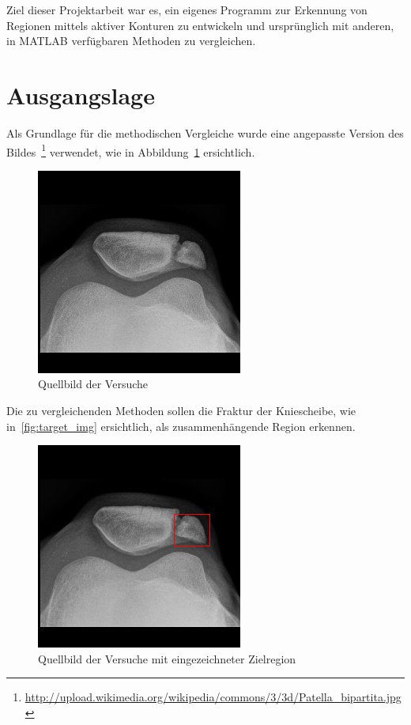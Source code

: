 Ziel dieser Projektarbeit war es, ein eigenes Programm zur Erkennung von Regionen mittels aktiver Konturen zu entwickeln und ursprünglich mit anderen, in MATLAB verfügbaren Methoden zu vergleichen.

\section{Ausgangslage}
\label{sec:proceeding:basics}
Als Grundlage für die methodischen Vergleiche wurde eine angepasste Version des Bildes~\footnote{\url{http://upload.wikimedia.org/wikipedia/commons/3/3d/Patella_bipartita.jpg}} verwendet, wie in Abbildung~\ref{fig:source_img} ersichtlich.

\begin{figure}[h!]
    \centering
    \includegraphics[scale=0.5]{images/patella_bipartita.jpg}
    \caption{Quellbild der Versuche\protect\footnotemark{}}
\label{fig:source_img}
\end{figure}

Die zu vergleichenden Methoden sollen die Fraktur der Kniescheibe, wie in~\autoref{fig:target_img} ersichtlich, als zusammenhängende Region erkennen.

\begin{figure}[h!]
    \centering
    \includegraphics[scale=0.5]{images/patella_bipartita_target.jpg}
    \caption{Quellbild der Versuche mit eingezeichneter Zielregion\protect\footnotemark{}}
\label{fig:target_img}
\end{figure}

